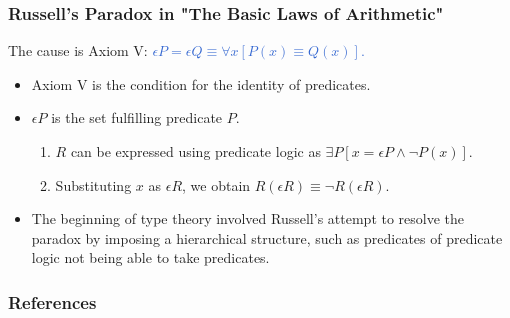 \documentclass[unicode, 14pt, aspectratio=169]{beamer}
\begin{document}
\begin{frame}
  \frametitle{Russell's Paradox in "The Basic Laws of Arithmetic"}
  {\large The cause is Axiom V: \textcolor{highlight}{$\epsilon P = \epsilon Q \equiv \forall x [P(x) \equiv Q(x)]$.}}
  \begin{itemize}
  \item Axiom V is the condition for the identity of predicates.
  \item $\epsilon P$ is the set fulfilling predicate $P$. 
    \begin{enumerate}
    \item $R$ can be expressed using predicate logic as $\exists P [x = \epsilon P \wedge \neg P(x)]$.
    \item Substituting $x$ as $\epsilon R$, we obtain $R(\epsilon R) \equiv \neg R(\epsilon R)$.
    \end{enumerate}
  \item The beginning of type theory involved Russell's attempt to resolve the paradox by imposing a hierarchical structure, such as predicates of predicate logic not being able to take predicates.
  \end{itemize}
\end{frame}
\begin{frame}[allowframebreaks,t]
  \frametitle{References}
  \printbibliography
  \nocite{*}
\end{frame}
\end{document}
